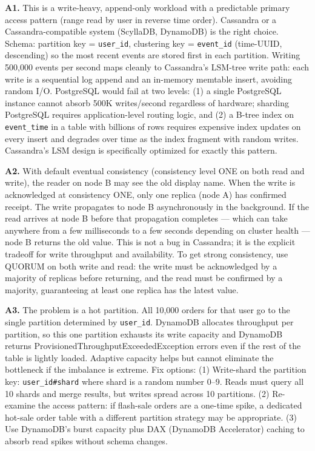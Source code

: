 \documentclass[11pt,a4paper]{article}
\begin{document}
\begin{answerbox}
\textbf{A1.} This is a write-heavy, append-only workload with a predictable primary access pattern (range read by user in reverse time order). Cassandra or a Cassandra-compatible system (ScyllaDB, DynamoDB) is the right choice. Schema: partition key = \texttt{user\_id}, clustering key = \texttt{event\_id} (time-UUID, descending) so the most recent events are stored first in each partition. Writing 500,000 events per second maps cleanly to Cassandra's LSM-tree write path: each write is a sequential log append and an in-memory memtable insert, avoiding random I/O. PostgreSQL would fail at two levels: (1) a single PostgreSQL instance cannot absorb 500K writes/second regardless of hardware; sharding PostgreSQL requires application-level routing logic, and (2) a B-tree index on \texttt{event\_time} in a table with billions of rows requires expensive index updates on every insert and degrades over time as the index fragment with random writes. Cassandra's LSM design is specifically optimized for exactly this pattern.

\bigskip
\textbf{A2.} With default eventual consistency (consistency level ONE on both read and write), the reader on node B may see the old display name. When the write is acknowledged at consistency ONE, only one replica (node A) has confirmed receipt. The write propagates to node B asynchronously in the background. If the read arrives at node B before that propagation completes --- which can take anywhere from a few milliseconds to a few seconds depending on cluster health --- node B returns the old value. This is not a bug in Cassandra; it is the explicit tradeoff for write throughput and availability. To get strong consistency, use QUORUM on both write and read: the write must be acknowledged by a majority of replicas before returning, and the read must be confirmed by a majority, guaranteeing at least one replica has the latest value.

\bigskip
\textbf{A3.} The problem is a hot partition. All 10,000 orders for that user go to the single partition determined by \texttt{user\_id}. DynamoDB allocates throughput per partition, so this one partition exhausts its write capacity and DynamoDB returns ProvisionedThroughputExceededException errors even if the rest of the table is lightly loaded. Adaptive capacity helps but cannot eliminate the bottleneck if the imbalance is extreme. Fix options: (1) Write-shard the partition key: \texttt{user\_id\#shard} where shard is a random number 0--9. Reads must query all 10 shards and merge results, but writes spread across 10 partitions. (2) Re-examine the access pattern: if flash-sale orders are a one-time spike, a dedicated hot-sale order table with a different partition strategy may be appropriate. (3) Use DynamoDB's burst capacity plus DAX (DynamoDB Accelerator) caching to absorb read spikes without schema changes.


\end{answerbox}
\end{document}
